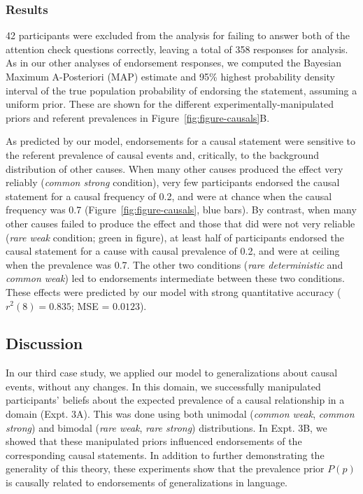 \documentclass[english,,man,floatsintext]{apa6}
\theoremstyle{definition}
\theoremstyle{definition}
\theoremstyle{definition}
\theoremstyle{remark}
\begin{document}
\hypertarget{results-3}{%
\subsubsection{Results}\label{results-3}}

42 participants were excluded from the analysis for failing to answer
both of the attention check questions correctly, leaving a total of 358
responses for analysis. As in our other analyses of endorsement
responses, we computed the Bayesian Maximum A-Posteriori (MAP) estimate
and 95\% highest probability density interval of the true population
probability of endorsing the statement, assuming a uniform prior. These
are shown for the different experimentally-manipulated priors and
referent prevalences in Figure~\ref{fig:figure-causals}B.

As predicted by our model, endorsements for a causal statement were
sensitive to the referent prevalence of causal events and, critically,
to the background distribution of other causes. When many other causes
produced the effect very reliably (\emph{common strong} condition), very
few participants endorsed the causal statement for a causal frequency of
0.2, and were at chance when the causal frequency was 0.7
(Figure~\ref{fig:figure-causals}, blue bars). By contrast, when many
other causes failed to produce the effect and those that did were not
very reliable (\emph{rare weak} condition; green in figure), at least
half of participants endorsed the causal statement for a cause with
causal prevalence of 0.2, and were at ceiling when the prevalence was
0.7. The other two conditions (\emph{rare deterministic} and
\emph{common weak}) led to endorsements intermediate between these two
conditions. These effects were predicted by our model with strong
quantitative accuracy (\(r^2(8) = 0.835\); MSE = \(0.0123\)).

\hypertarget{discussion-3}{%
\subsection{Discussion}\label{discussion-3}}

In our third case study, we applied our model to generalizations about
causal events, without any changes. In this domain, we successfully
manipulated participants' beliefs about the expected prevalence of a
causal relationship in a domain (Expt. 3A). This was done using both
unimodal (\emph{common weak}, \emph{common strong}) and bimodal
(\emph{rare weak}, \emph{rare strong}) distributions. In Expt. 3B, we
showed that these manipulated priors influenced endorsements of the
corresponding causal statements. In addition to further demonstrating
the generality of this theory, these experiments show that the
prevalence prior \(P(p)\) is causally related to endorsements of
generalizations in language.
\end{document}
